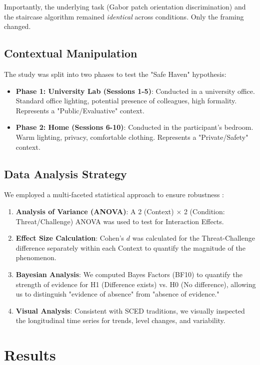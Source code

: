 \documentclass[journal]{IEEEtran}
\begin{document}
Importantly, the underlying task (Gabor patch orientation discrimination) and the staircase algorithm remained \textit{identical} across conditions. Only the framing changed.

\subsection{Contextual Manipulation}
The study was split into two phases to test the "Safe Haven" hypothesis:
\begin{itemize}
    \item \textbf{Phase 1: University Lab (Sessions 1-5)}: Conducted in a university office. Standard office lighting, potential presence of colleagues, high formality. Represents a "Public/Evaluative" context.
    \item \textbf{Phase 2: Home (Sessions 6-10)}: Conducted in the participant's bedroom. Warm lighting, privacy, comfortable clothing. Represents a "Private/Safety" context.
\end{itemize}

\subsection{Data Analysis Strategy}
We employed a multi-faceted statistical approach to ensure robustness \cite{sced_stats}:
\begin{enumerate}
    \item \textbf{Analysis of Variance (ANOVA)}: A 2 (Context) $\times$ 2 (Condition: Threat/Challenge) ANOVA was used to test for Interaction Effects.
    \item \textbf{Effect Size Calculation}: Cohen's $d$ \cite{d_estimation} was calculated for the Threat-Challenge difference separately within each Context to quantify the magnitude of the phenomenon.
    \item \textbf{Bayesian Analysis}: We computed Bayes Factors (BF10) to quantify the strength of evidence for H1 (Difference exists) vs. H0 (No difference), allowing us to distinguish "evidence of absence" from "absence of evidence."
    \item \textbf{Visual Analysis}: Consistent with SCED traditions, we visually inspected the longitudinal time series for trends, level changes, and variability.
\end{enumerate}

\section{Results}
\end{document}
